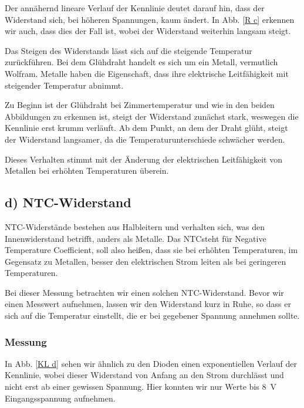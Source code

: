 \documentclass[11pt,a4paper,titlepage, ngerman]{article}
\begin{document}
				Der annähernd lineare Verlauf der Kennlinie deutet darauf hin, dass der Widerstand sich, bei höheren Spannungen, kaum ändert. In Abb. \ref{R c} erkennen wir auch, dass dies der Fall ist, wobei der Widerstand weiterhin langsam steigt.
				
				Das Steigen des Widerstands lässt sich auf die steigende Temperatur zurückführen. Bei dem Glühdraht handelt es sich um ein Metall, vermutlich Wolfram. Metalle haben die Eigenschaft, dass ihre elektrische Leitfähigkeit mit steigender Temperatur abnimmt.
				
				Zu Beginn ist der Glühdraht bei Zimmertemperatur und wie in den beiden Abbildungen zu erkennen ist, steigt der Widerstand zunächst stark, weswegen die Kennlinie erst krumm verläuft. Ab dem Punkt, an dem der Draht glüht, steigt der Widerstand langsamer, da die Temperaturunterschiede schwächer werden.
				
				Dieses Verhalten stimmt mit der Änderung der elektrischen Leitfähigkeit von Metallen bei erhöhten Temperaturen überein.
				
		\subsection{d) NTC-Widerstand} 
			
			NTC-Widerstände bestehen aus Halbleitern und verhalten sich, was den Innenwiderstand betrifft, anders als Metalle. Das \glqq NTC\grqq  steht für \glqq Negative Temperature Coefficient\grqq , soll also heißen, dass sie bei erhöhten Temperaturen, im Gegensatz zu Metallen, besser den elektrischen Strom leiten als bei geringeren Temperaturen.
			
			Bei dieser Messung betrachten wir einen solchen NTC-Widerstand. Bevor wir einen Messwert aufnehmen, lassen wir den Widerstand kurz in Ruhe, so dass er sich auf die Temperatur einstellt, die er bei gegebener Spannung annehmen sollte. 
			
			\subsubsection*{Messung}
			
				In Abb. \ref{KL d} sehen wir ähnlich zu den Dioden einen exponentiellen Verlauf der Kennlinie, wobei dieser Widerstand von Anfang an den Strom durchlässt und nicht erst ab einer gewissen Spannung.
				Hier konnten wir nur Werte bis \SI{8}{\V} Eingangsspannung aufnehmen.
				
\end{document}
